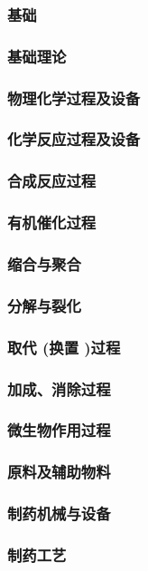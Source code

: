 \documentclass[UTF8]{../../ApplicationUniverse}
\begin{document}
\subsubsection{基础}
    \subsubsection{基础理论}
    \subsubsection{物理化学过程及设备}
    \subsubsection{化学反应过程及设备}
        \subsubsection{合成反应过程}
        \subsubsection{有机催化过程}
        \subsubsection{缩合与聚合}
        \subsubsection{分解与裂化}
        \subsubsection{取代 (换置 )过程}
        \subsubsection{加成、消除过程}
        \subsubsection{微生物作用过程}
    \subsubsection{原料及辅助物料}
    \subsubsection{制药机械与设备}
    \subsubsection{制药工艺}
\end{document}
